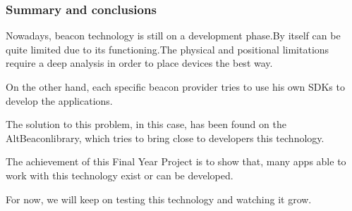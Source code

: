 \begin{frame} [fragile]
	\frametitle{Summary and conclusions}
		Nowadays, beacon technology is still on a development phase.By itself can be quite limited due to its functioning.The physical and positional limitations require a deep analysis in order to place devices the best way.
		
		\bigskip
		On the other hand, each specific beacon provider tries to use his own SDKs to develop the applications.
		
		\bigskip
		The solution to this problem, in this case, has been found on the AltBeaconlibrary, which tries to bring close to developers this technology.
		
		\bigskip
	The achievement of this Final Year Project is to show that, many apps able to work with this technology exist or can be developed.
	
		\bigskip
		For now, we will keep on testing this technology and watching it grow.

	\endblock{}
\end{frame}